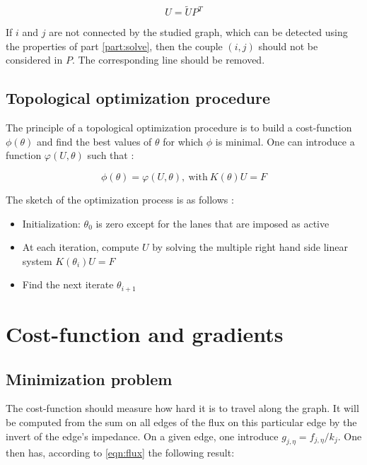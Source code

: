 \documentclass[11pt,a4paper]{article}		%
\begin{document}
\begin{equation}
U = \tilde{U} P^T
\end{equation}

If $i$ and $j$ are not connected by the studied graph, which can be detected using the properties of part \ref{part:solve}, then the couple $(i,j)$ should not be considered in $P$. The corresponding line should be removed.

\subsection{Topological optimization procedure}

The principle of a topological optimization procedure is to build a cost-function $\phi(\theta)$ and find the best values of $\theta$ for which $\phi$ is minimal. One can introduce a function $\varphi(U,\theta)$ such that :

\begin{equation}
\phi(\theta) = \varphi(U,\theta),\ \text{with}\ K(\theta)U = F
\end{equation}

The sketch of the optimization process is as follows :

\begin{itemize}
	\item Initialization: $\theta_0$ is zero except for the lanes that are imposed as active
	\item At each iteration, compute $U$ by solving the multiple right hand side linear system $K(\theta_i)U=F$
	\item Find the next iterate $\theta_{i+1}$
\end{itemize}
	

\section{Cost-function and gradients}

\subsection{Minimization problem}

The cost-function should measure how hard it is to travel along the graph. It will be computed from the sum on all edges of the flux on this particular edge by the invert of the edge's impedance. On a given edge, one introduce $g_{j,\eta} = f_{j,\eta}/k_j$. One then has, according to \eqref{eqn:flux} the following result:
\end{document}
